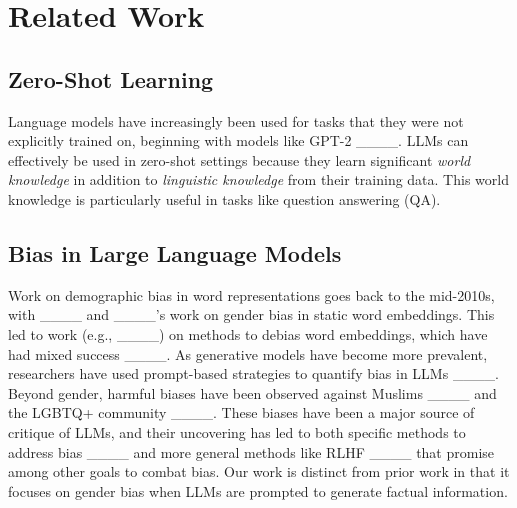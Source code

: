 \section{Related Work}
\subsection{Zero-Shot Learning}
Language models have increasingly been used for tasks that they were not explicitly trained on, beginning with models like GPT-2 ____. LLMs can effectively be used in zero-shot settings because they learn significant \textit{world knowledge} in addition to \textit{linguistic knowledge} from their training data. This world knowledge is particularly useful in tasks like question answering (QA).%


\subsection{Bias in Large Language Models}
Work on demographic bias in word representations goes back to the mid-2010s, with ____ and ____'s work on gender bias in static word embeddings. This led to work (e.g., ____) on methods to debias word embeddings, which have had mixed success ____. As generative models have become more prevalent, researchers have used prompt-based strategies to quantify bias in LLMs ____. Beyond gender, harmful biases have been observed against Muslims ____ and the LGBTQ+ community ____. These biases have been a major source of critique of LLMs, and their uncovering has led to both specific methods to address bias ____ and more general methods like RLHF ____ that promise among other goals to combat bias. Our work is distinct from prior work in that it focuses on gender bias when LLMs are prompted to generate factual information.